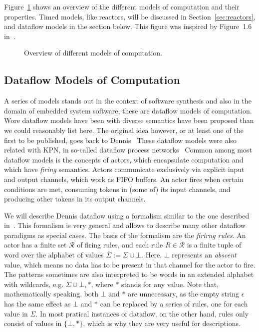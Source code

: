 Figure~\ref{fig:dataflow_mocs} shows an overview of the different models of computation and their properties.
Timed models, like reactors, will be discussed in Section~\ref{sec:reactors}, and dataflow models in the section below.
This figure was inspired by Figure~1.6 in~\cite{Ptolemaeus:14:SystemDesign}.

\begin{figure}[h]
	\centering
   \resizebox{0.95\textwidth}{!}{}
	\caption{Overview of different models of computation.}
	\label{fig:dataflow_mocs}
\end{figure}


\subsection{Dataflow Models of Computation}

A series of models stands out in the context of software synthesis and also in the domain of embedded system software, these are dataflow models of computation.
Wore dataflow models have been with diverse semantics have been proposed than we could reasonably list here.
The original idea however, or at least one of the first to be published, goes back to Dennis~\cite{dennis1974first,dennis1986data}
These dataflow models were also related with \ac{KPN}, in so-called dataflow process networks~\cite{lee1995dataflow,lee_matsikoudis_semantics}
Common among most dataflow models is the concepts of actors, which encapsulate computation and which have \emph{firing} semantics.
Actors communicate exclusively via explicit input and output channels, which work as \acs{FIFO} buffers.
An actor fires when certain conditions are met, consuming tokens in (some of) its input channels, and producing other tokens in its output channels.

We will describe Dennis dataflow using a formalism similar to the one described in~\cite{Parks:M95:105,lee_matsikoudis_semantics}.
This formalism is very general and allows to describe many other dataflow paradigms as special cases.
The basis of the formalism are the \emph{firirng rules}.
An actor has a finite set $\mathcal{R}$ of firing rules, and each rule $R \in \mathcal{R}$ is a finite tuple of word over the alphabet of values $\bar \Sigma := \Sigma \cup {\bot}$.
Here, $\bot$ represents an \emph{abscent} value, which means no data has to be present in that channel for the actor to fire.
The patterns sometimes are also interpreted to be words in an extended alphabet with wildcards, e.g. $\Sigma \cup {\bot,*}$, where $*$ stands for any value.
Note that, mathematically speaking, both $\bot$ and $*$ are unnecessary, as the empty string $\epsilon$ has the same effect as $\bot$ and $*$ can be replaced by a series of rules, one for each value in $\Sigma$.
In most pratical instances of dataflow, on the other hand, rules only consist of values in $\{\bot,*\}$, which is why they are very useful for descriptions.

